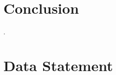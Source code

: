 \documentclass[a4]{article}
\begin{document}




\section{Conclusion} 


.\section{Data Statement}





\appendix

\end{document}
